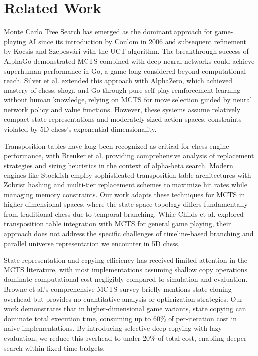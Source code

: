 \documentclass{article}
\begin{document}
\section{Related Work}

Monte Carlo Tree Search has emerged as the dominant approach for game-playing AI since its introduction by Coulom in 2006 and subsequent refinement by Kocsis and Szepesvári with the UCT algorithm. The breakthrough success of AlphaGo demonstrated MCTS combined with deep neural networks could achieve superhuman performance in Go, a game long considered beyond computational reach. Silver et al. extended this approach with AlphaZero, which achieved mastery of chess, shogi, and Go through pure self-play reinforcement learning without human knowledge, relying on MCTS for move selection guided by neural network policy and value functions. However, these systems assume relatively compact state representations and moderately-sized action spaces, constraints violated by 5D chess's exponential dimensionality.

Transposition tables have long been recognized as critical for chess engine performance, with Breuker et al. providing comprehensive analysis of replacement strategies and sizing heuristics in the context of alpha-beta search. Modern engines like Stockfish employ sophisticated transposition table architectures with Zobrist hashing and multi-tier replacement schemes to maximize hit rates while managing memory constraints. Our work adapts these techniques for MCTS in higher-dimensional spaces, where the state space topology differs fundamentally from traditional chess due to temporal branching. While Childs et al. explored transposition table integration with MCTS for general game playing, their approach does not address the specific challenges of timeline-based branching and parallel universe representation we encounter in 5D chess.

State representation and copying efficiency has received limited attention in the MCTS literature, with most implementations assuming shallow copy operations dominate computational cost negligibly compared to simulation and evaluation. Browne et al.'s comprehensive MCTS survey briefly mentions state cloning overhead but provides no quantitative analysis or optimization strategies. Our work demonstrates that in higher-dimensional game variants, state copying can dominate total execution time, consuming up to 60\% of per-iteration cost in naive implementations. By introducing selective deep copying with lazy evaluation, we reduce this overhead to under 20\% of total cost, enabling deeper search within fixed time budgets.
\end{document}
